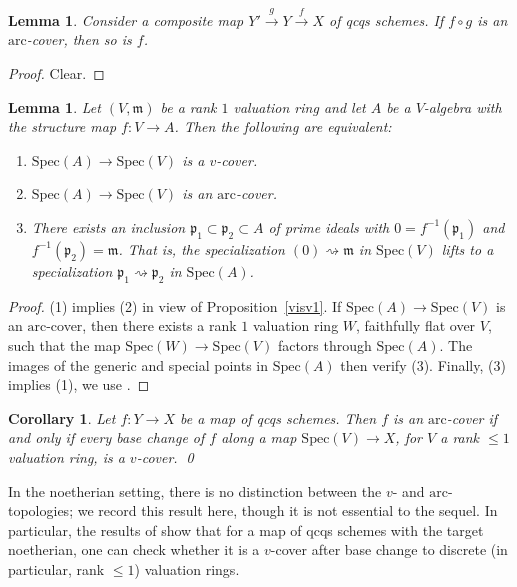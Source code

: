 \documentclass[reqno]{amsart}
\newcommand{\arc}{\mathrm{arc}}
\newtheorem{lemma}[theorem]{Lemma}
\newtheorem{corollary}[theorem]{Corollary}
\theoremstyle{definition}
\begin{document}
\begin{lemma} 
\label{compositemaparccover}
Consider a composite map $Y' \stackrel{g}{\to} Y \stackrel{f}{\to} X$ of
qcqs schemes.  If $f \circ g$ is an $\arc$-cover, then so is $f$. 
\end{lemma} 
\begin{proof} 
Clear. 
\end{proof} 



\begin{lemma} 
\label{arccovercrit}
Let $(V, \mathfrak{m})$ be a rank $1$ valuation ring and let $A$ be a
$V$-algebra with the
structure map $f\colon  V \to A$. 
Then the following are equivalent: 
\begin{enumerate}
\item $\mathrm{Spec} (A) \to \mathrm{Spec} (V) $ is a $v$-cover.  
\item $\mathrm{Spec} (A) \to \mathrm{Spec} (V) $ is an $\arc$-cover.
\item 
There exists an inclusion $\mathfrak{p}_1 \subset \mathfrak{p}_2 \subset A$ of prime ideals with $0 = f^{-1}( \mathfrak{p}_1)$  and $f^{-1}(\mathfrak{p}_2) = \mathfrak{m}$. That is, the specialization $(0) \rightsquigarrow \mathfrak{m}$ in $\mathrm{Spec}(V)$ lifts to a specialization $\mathfrak{p}_1 \rightsquigarrow \mathfrak{p}_2$ in $\mathrm{Spec}(A)$.
\end{enumerate}
\end{lemma} 
\begin{proof} 
(1) implies (2) in view of Proposition~\ref{visv1}. If $\mathrm{Spec} (A )\to
\mathrm{Spec} (V)$ is an
$\arc$-cover, then there exists a rank $1$ valuation ring $W$, faithfully
flat over $V$, such that the map $\mathrm{Spec} (W) \to \mathrm{Spec} (V)$ factors through $\mathrm{Spec}
(A)$. 
The images of the generic and special points in $\mathrm{Spec} (A)$ then verify (3).
Finally, (3) implies (1), 
we use \cite[Prop.~2.7]{Rydh}. 
\end{proof} 

\begin{corollary} 
\label{v1detectionr1}
Let $f\colon  Y \to X$ be a map of qcqs schemes. Then $f$ is an $\arc$-cover if and only if every base change of $f$ along a map $\mathrm{Spec}(V) \to X$, for $V$ a rank $\leq 1$
valuation ring, is a $v$-cover. \qed
\end{corollary} 

In the noetherian setting, there is no distinction between the $v$- and
$\arc$-topologies; we record this result here, though it is not essential to
the sequel. In particular, the results of \cite{Rydh} show that for a map of
qcqs schemes with the target noetherian, one can check whether it is a
$v$-cover after base change to discrete (in particular, rank $\leq 1$) valuation rings. 
\end{document}

